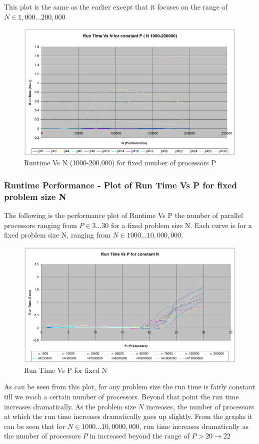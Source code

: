 \documentclass[twoside,11pt]{article}\usepackage{amsmath,amsfonts,amsthm,fullpage}
\begin{document}
This plot is the same as the earlier except that it focuses on the range of  $N \in 1,000 \dots 200,000$
\begin{figure}[!htbp]
\centering
\includegraphics[scale=.46]{charts/p-n-t-1000-200000} 
\caption{Runtime Vs N (1000-200,000) for fixed number of processors P}
\label{Runtime Vs N (1000-200000) for fixed number of processors}
\end{figure}


\pagebreak
\subsubsection{Runtime Performance - Plot of Run Time Vs P for fixed problem size N}
The following is the performance plot of Runtime Vs P the number of parallel processors ranging from  $P \in 3 \dots 30$ for a fixed problem size N. Each curve is for a fixed problem size N, ranging from  $N \in 1000 \dots 10,000,000$.

\begin{figure}[!htbp]
\centering
\includegraphics[scale=.46]{charts/n-p-t} 
\caption{Run Time Vs P for fixed N}
\label{Run Time Vs P for fixed N}
\end{figure}
As can be seen from this plot, for any problem size the run time is fairly constant till we reach a certain number of processors. Beyond that point the run time increases dramatically. As the problem size $N$ increases, the number of processors at which the run time increases dramatically goes up slightly. From the graphs it can be seen that for $N \in 1000 \dots 10,0000,000$, run time increases dramatically as the number of processors $P$ in increased beyond the range of $P > 20 \to 22$
\end{document}
